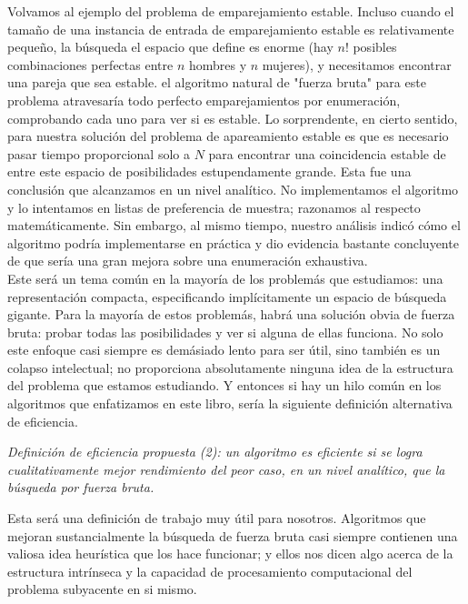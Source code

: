 \documentclass[a4paper]{article}
\begin{document}
Volvamos al ejemplo del problema de emparejamiento estable. Incluso cuando el tamaño de una instancia de entrada de emparejamiento estable es relativamente pequeño, la búsqueda el espacio que define es enorme (hay $n!$ posibles combinaciones perfectas entre $n$ hombres y $n$ mujeres), y necesitamos encontrar una pareja que sea estable. el algoritmo natural de "fuerza bruta" para este problema atravesaría todo perfecto emparejamientos por enumeración, comprobando cada uno para ver si es estable. Lo sorprendente, en cierto sentido, para nuestra solución del problema de apareamiento estable es que es necesario pasar tiempo proporcional solo a $N$ para encontrar una coincidencia estable de entre este espacio de posibilidades estupendamente grande. Esta fue una conclusión que alcanzamos en un nivel analítico. No implementamos el algoritmo y lo intentamos en listas de preferencia de muestra; razonamos al respecto matemáticamente. Sin embargo, al mismo tiempo, nuestro análisis indicó cómo el algoritmo podría implementarse en práctica y dio evidencia bastante concluyente de que sería una gran mejora sobre una enumeración exhaustiva. \\

Este será un tema común en la mayoría de los problemás que estudiamos: una representación compacta, especificando implícitamente un espacio de búsqueda gigante. Para la mayoría de estos problemás, habrá una solución obvia de fuerza bruta: probar todas las posibilidades y ver si alguna de ellas funciona. No solo este enfoque casi siempre es demásiado lento para ser útil, sino también es un colapso intelectual; no proporciona absolutamente ninguna idea de la estructura del problema que estamos estudiando. Y entonces si hay un hilo común en los algoritmos que enfatizamos en este libro, sería la siguiente definición alternativa de eficiencia. \\

\begin{center}\textit{Definición de eficiencia propuesta (2): un algoritmo es eficiente si se logra cualitativamente mejor rendimiento del peor caso, en un nivel analítico, que la búsqueda por fuerza bruta.}\end{center}

Esta será una definición de trabajo muy útil para nosotros. Algoritmos que mejoran sustancialmente la búsqueda de fuerza bruta casi siempre contienen una valiosa idea heurística que los hace funcionar; y ellos nos dicen algo acerca de la estructura intrínseca y la capacidad de procesamiento computacional del problema subyacente  en si mismo.\\
\end{document}
